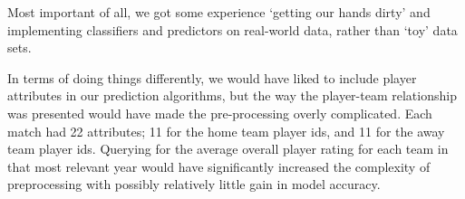\documentclass[11pt]{article}
\begin{document}
Most important of all, we got some experience `getting our hands dirty' and implementing classifiers and predictors on real-world data, rather than `toy' data sets.

In terms of doing things differently, we would have liked to include player attributes in our prediction algorithms, but the way the player-team relationship was presented would have made the pre-processing overly complicated.
Each match had 22 attributes; 11 for the home team player ids, and 11 for the away team player ids.
Querying for the average overall player rating for each team in that most relevant year would have significantly increased the complexity of preprocessing with possibly relatively little gain in model accuracy.



\end{document}
